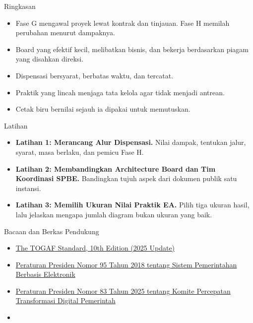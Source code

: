 \documentclass[aspectratio=169, table, 12pt]{beamer}
\begin{document}
\begin{frame}{{\Large Ringkasan}}
  \small
  \vspace{4pt}
  \begin{itemize}
    \item Fase G mengawal proyek lewat kontrak dan tinjauan. Fase H memilah perubahan menurut dampaknya.
    \item Board yang efektif kecil, melibatkan bisnis, dan bekerja berdasarkan piagam yang disahkan
          direksi.
    \item Dispensasi bersyarat, berbatas waktu, dan tercatat.
    \item Praktik yang lincah menjaga tata kelola agar tidak menjadi antrean.
    \item Cetak biru bernilai sejauh ia dipakai untuk memutuskan.
  \end{itemize}
\end{frame}

\begin{frame}{{\Large Latihan}}
  \small
  \vspace{6pt}
  \begin{itemize}
    \item \textbf{Latihan 1: Merancang Alur Dispensasi.} Nilai dampak, tentukan jalur, syarat, masa
          berlaku, dan pemicu Fase H.
    \item \textbf{Latihan 2: Membandingkan Architecture Board dan Tim Koordinasi SPBE.} Bandingkan tujuh
          aspek dari dokumen publik satu instansi.
    \item \textbf{Latihan 3: Memilih Ukuran Nilai Praktik EA.} Pilih tiga ukuran hasil, lalu jelaskan
          mengapa jumlah diagram bukan ukuran yang baik.
  \end{itemize}
\end{frame}

\begin{frame}{{\Large Bacaan dan Berkas Pendukung}}
  \small
  \vspace{6pt}
  \begin{itemize}
    \item \href{https://www.opengroup.org/togaf}{The TOGAF Standard, 10th Edition (2025 Update)}
    \item \href{https://peraturan.bpk.go.id/Details/96913/perpres-no-95-tahun-2018}{Peraturan Presiden Nomor 95 Tahun 2018 tentang Sistem Pemerintahan Berbasis Elektronik}
    \item \href{https://peraturan.bpk.go.id/Details/329002/perpres-no-83-tahun-2025}{Peraturan Presiden Nomor 83 Tahun 2025 tentang Komite Percepatan Transformasi Digital Pemerintah}
    \item {}
  \end{itemize}
\end{frame}
\end{document}

